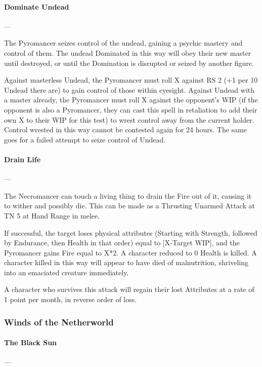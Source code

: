 \documentclass[oneside,11pt,english]{book}
\begin{document}
\paragraph{Dominate Undead}
---\quad [4+X]

The Pyromancer seizes control of the undead, gaining a psychic mastery and
control of them. The undead Dominated in this way will obey their new master
until destroyed, or until the Domination is disrupted or seized by another
figure.

Against masterless Undead, the Pyromancer must roll X against RS 2 (+1 per 10
Undead there are) to gain control of those within eyesight. Against Undead with
a master already, the Pyromancer must roll X against the opponent’s WIP (if the
opponent is also a Pyromancer, they can cast this spell in retaliation to add
their own X to their WIP for this test) to wrest control away from the current
holder. Control wrested in this way cannot be contested again for 24 hours. The
same goes for a failed attempt to seize control of Undead.

\paragraph{Drain Life} 
---\quad [X]

The Necromancer can touch a living thing to drain the Fire out of it, causing it
to wither and possibly die. This can be made as a Thrusting Unarmed Attack at TN
5 at Hand Range in melee.

If successful, the target loses physical attributes (Starting with Strength,
followed by Endurance, then Health in that order) equal to [X-Target WIP], and
the Pyromancer gains Fire equal to X*2. A character reduced to 0 Health is
killed. A character killed in this way will appear to have died of malnutrition,
shriveling into an emaciated creature immediately.

A character who survives this attack will regain their lost Attributes at a rate
of 1 point per month, in reverse order of loss.

\subsubsection{Winds of the Netherworld}

\paragraph{The Black Sun}
---\quad [10+X] 
\end{document}
